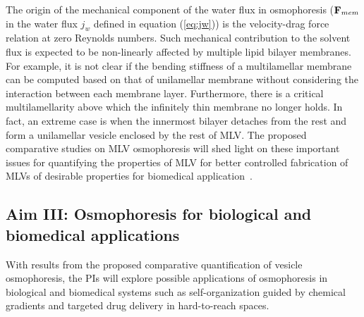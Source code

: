 \documentclass[11pt]{article}
\begin{document}
The origin of the mechanical component of the water flux in osmophoresis
(${\bf F}_{mem}$ in the water flux $j_w$ defined in equation
(\ref{eq:jw})) is the velocity-drag force relation at zero Reynolds
numbers.  Such mechanical contribution  to the solvent flux is expected
to be non-linearly affected by multiple lipid bilayer membranes. For
example, it is not clear if the bending stiffness of a multilamellar
membrane can be computed based on that of unilamellar membrane without
considering the interaction between each membrane layer.  Furthermore,
there is a critical multilamellarity above which the infinitely thin
membrane no longer holds. In fact, an extreme case is when the innermost
bilayer detaches from the rest and form a unilamellar vesicle enclosed
by the rest of MLV.  The proposed comparative studies on MLV
osmophoresis will shed light on these important issues for quantifying
the properties of MLV for better controlled fabrication of MLVs of
desirable properties for biomedical
application~\cite{Drazenovic2015_BBA,Eloy2014_CSB}.

\subsection{Aim III: Osmophoresis for biological and biomedical
applications \label{subsec:biological_biomedical_applications}}
With results from the proposed comparative quantification of vesicle
osmophoresis, the PIs will explore possible applications of osmophoresis
in biological and biomedical systems such as self-organization guided by
chemical gradients and targeted drug delivery in hard-to-reach spaces.

\end{document}
